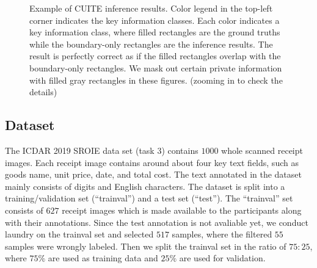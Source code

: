 \documentclass[10pt,twocolumn,letterpaper]{article}
\begin{document}
\begin{figure}
\begin{center}
\end{center}
   \caption{Example of CUITE inference results. Color legend in the top-left corner indicates the key information classes. Each color indicates a key information class, where filled rectangles are the ground truths while the boundary-only rectangles are the inference results. The result is perfectly correct as if the filled rectangles overlap with the boundary-only rectangles. We mask out certain private information with filled gray rectangles in these figures. (zooming in to check the details)}
\label{fig:result}
\end{figure}

\subsection{Dataset}
The ICDAR 2019 SROIE data set (task 3) contains $1000$ whole scanned receipt images. Each receipt image contains around about four key text fields, such as goods name, unit price, date, and total cost. The text annotated in the dataset mainly consists of digits and English characters. The dataset is split into a training/validation set (“trainval”) and a test set (“test”). The “trainval” set consists of $627$ receipt images which is made available to the participants along with their annotations. Since the test annotation is not avaliable yet, we conduct laundry on the trainval set and selected $517$ samples, where the filtered $55$ samples were wrongly labeled. Then we split the trainval set in the ratio of $75:25$, where $75\%$ are used as training data and $25\%$ are used for validation.
\end{document}
